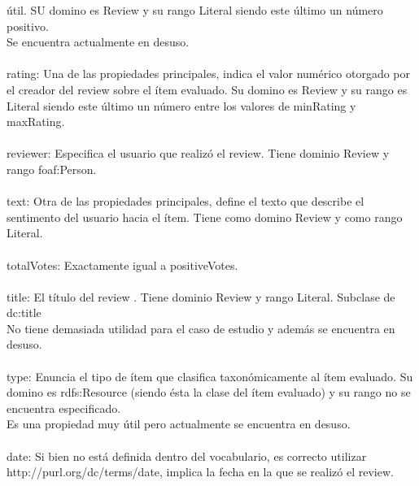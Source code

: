 útil. SU domino es Review y su rango Literal siendo este último un número positivo.\\
Se encuentra actualmente en desuso.\\
\\
rating: Una de las propiedades principales, indica el valor numérico otorgado por el creador del review sobre el ítem evaluado. 
Su domino es Review y su rango es Literal siendo este último un número entre los valores de minRating y maxRating.\\
\\
reviewer: Especifica el usuario que realizó el review. Tiene dominio Review y rango foaf:Person. \\
\\
text: Otra de las propiedades principales, define el texto que describe el sentimento del usuario hacia el ítem. Tiene como 
domino Review y como rango Literal.\\
\\
totalVotes: Exactamente igual a positiveVotes.\\
\\
title: El título del review . Tiene dominio Review y rango Literal. Subclase de dc:title\\
No tiene demasiada utilidad para el caso de estudio y además se encuentra en desuso.\\
\\
type: Enuncia el tipo de ítem que clasifica taxonómicamente al ítem evaluado. Su domino es rdfs:Resource (siendo ésta la clase del ítem evaluado)  
y su rango no se encuentra especificado. \\
Es una propiedad muy útil pero actualmente se encuentra en desuso.\\
\\
date: Si bien no está definida dentro del vocabulario, es correcto utilizar http://purl.org/dc/terms/date, implica la fecha en la 
que se realizó el review.\\
\\

